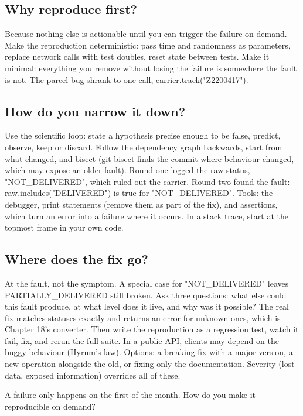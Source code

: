\documentclass[10pt]{article}
\newcommand{\code}[1]{{\ttfamily\small #1}}
\begin{document}
\subsection{Why reproduce first?}
Because nothing else is actionable until you can trigger the failure on demand. Make the reproduction deterministic: pass time and randomness as parameters, replace network calls with test doubles, reset state between tests. Make it minimal: everything you remove without losing the failure is somewhere the fault is not. The parcel bug shrank to one call, \code{carrier.track("Z2200417")}.

\subsection{How do you narrow it down?}
Use the scientific loop: state a hypothesis precise enough to be false, predict, observe, keep or discard. Follow the dependency graph backwards, start from what changed, and bisect (\code{git bisect} finds the commit where behaviour changed, which may expose an older fault). Round one logged the raw status, \code{"NOT\_DELIVERED"}, which ruled out the carrier. Round two found the fault: \code{raw.includes("DELIVERED")} is true for \code{"NOT\_DELIVERED"}. Tools: the debugger, print statements (remove them as part of the fix), and assertions, which turn an error into a failure where it occurs. In a stack trace, start at the topmost frame in your own code.

\subsection{Where does the fix go?}
At the fault, not the symptom. A special case for \code{"NOT\_DELIVERED"} leaves \code{PARTIALLY\_DELIVERED} still broken. Ask three questions: what else could this fault produce, at what level does it live, and why was it possible? The real fix matches statuses exactly and returns an error for unknown ones, which is Chapter 18's converter. Then write the reproduction as a regression test, watch it fail, fix, and rerun the full suite. In a public API, clients may depend on the buggy behaviour (Hyrum's law). Options: a breaking fix with a major version, a new operation alongside the old, or fixing only the documentation. Severity (lost data, exposed information) overrides all of these.

\begin{ponder}
A failure only happens on the first of the month. How do you make it reproducible on demand?
\end{ponder}
\end{document}
